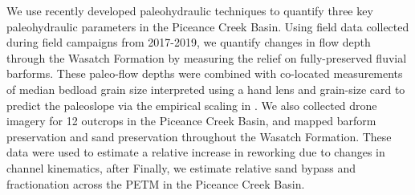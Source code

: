 \documentclass[draft]{compact_proposal}\usepackage[]{graphicx}\usepackage[]{color}
\begin{document}
We use recently developed paleohydraulic techniques to quantify three key paleohydraulic parameters in the Piceance Creek Basin.
Using field data collected during field campaigns from 2017-2019, we quantify changes in flow depth through the Wasatch Formation by measuring the relief on fully-preserved fluvial barforms. 
These paleo-flow depths were combined with co-located measurements of median bedload grain size interpreted using a hand lens and grain-size card to predict the paleoslope via the empirical scaling in \textcite{trampush_empirical_2014}.
We also collected drone imagery for 12 outcrops in the Piceance Creek Basin, and mapped barform preservation and sand preservation throughout the Wasatch Formation. 
These data were used to estimate a relative increase in reworking due to changes in channel kinematics, after \textcite{chamberlin_using_2019} 
Finally, we estimate relative sand bypass and fractionation across the PETM in the Piceance Creek Basin.
\end{document}
